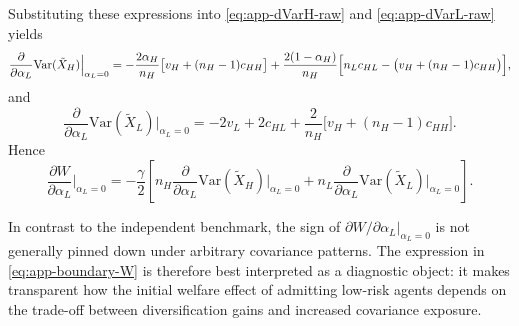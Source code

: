\documentclass[a4paper,12pt]{article}
\theoremstyle{definition}
\theoremstyle{remark}
\newcommand{\Var}{\mathrm{Var}}
\newcommand{\1}{\mathbf{1}}
\begin{document}
Substituting these expressions into \eqref{eq:app-dVarH-raw} and
\eqref{eq:app-dVarL-raw} yields
\begin{equation}
\frac{\partial}{\partial \alpha_L}\Var(\tilde X_H)\Big|_{\alpha_L=0}
=
-\frac{2\alpha_H}{n_H}
\bigl[v_H+(n_H-1)c_{HH}\bigr]
+
\frac{2(1-\alpha_H)}{n_H}
\Bigl[n_Lc_{HL}-\bigl(v_H+(n_H-1)c_{HH}\bigr)\Bigr],
\label{eq:app-boundary-dVarH}
\end{equation}
and
\begin{equation}
\frac{\partial}{\partial \alpha_L}\Var(\tilde X_L)\Big|_{\alpha_L=0}
=
-2v_L
+
2c_{HL}
+
\frac{2}{n_H}
\bigl[v_H+(n_H-1)c_{HH}\bigr].
\label{eq:app-boundary-dVarL}
\end{equation}
Hence
\begin{equation}
\frac{\partial W}{\partial \alpha_L}\Big|_{\alpha_L=0}
=
-\frac{\gamma}{2}
\left[
n_H\frac{\partial}{\partial \alpha_L}\Var(\tilde X_H)\Big|_{\alpha_L=0}
+
n_L\frac{\partial}{\partial \alpha_L}\Var(\tilde X_L)\Big|_{\alpha_L=0}
\right].
\label{eq:app-boundary-W}
\end{equation}

In contrast to the independent benchmark, the sign of
\(\partial W/\partial\alpha_L\vert_{\alpha_L=0}\) is not generally pinned down
under arbitrary covariance patterns. The expression in
\eqref{eq:app-boundary-W} is therefore best interpreted as a diagnostic object:
it makes transparent how the initial welfare effect of admitting low-risk
agents depends on the trade-off between diversification gains and increased
covariance exposure.



\newpage


\end{document}
